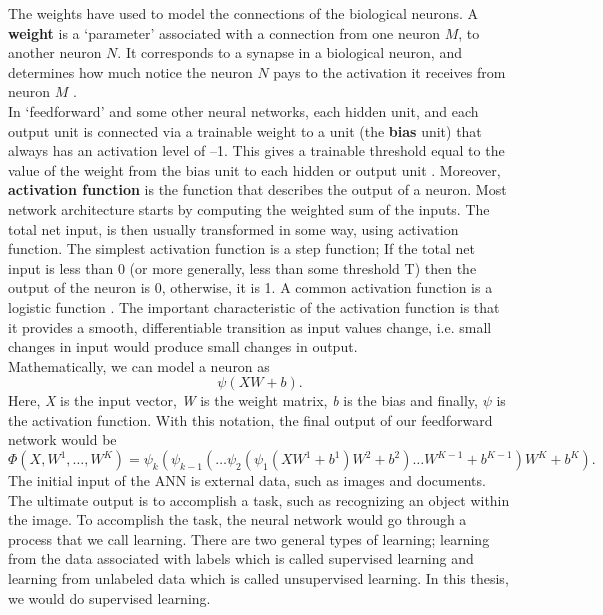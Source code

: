 The weights have used to model the connections of the biological neurons. A \textbf{weight} is a `parameter' associated with a connection from one neuron $M$, to another neuron $N$. It corresponds to a synapse in a biological neuron, and determines how much notice the neuron $N$ pays to the activation it receives from neuron $M$ \cite{MLDict}.\\ %
In `feedforward' and some other neural networks, each hidden unit, and each output unit is connected via a trainable weight to a unit (the \textbf{bias} unit) that always has an activation level of –1. This gives a trainable threshold equal to the value of the weight from the bias unit to each hidden or output unit \cite{MLDict}.
Moreover, \textbf{activation function} is the function that describes the output of a neuron. Most network architecture starts by computing the weighted sum of the inputs. The total net input, is then usually transformed in some way, using activation function. The simplest activation function is a step function; If the total net input is less than 0 (or more generally, less than some threshold T) then the output of the neuron is 0, otherwise, it is 1. A common activation function is a logistic function \cite{MLDict}. The important characteristic of the activation function is that it provides a smooth, differentiable transition as input values change, i.e. small changes in input would produce small changes in output.\\
Mathematically, we can model a neuron as
\begin{equation}
\psi(XW+b).
\end{equation} 
Here, \textit{X} is the input vector, \textit{W} is the weight matrix, \textit{b} is the bias and finally, $\psi$ is the activation function. With this notation, the final output of our feedforward network would be
\begin{equation}
\Phi(X,W^1,\dots,W^K) = \psi_{k}(\psi_{k-1}(\dots \psi_{2}(\psi_{1}(XW^1+b^1)W^2+b^2)\dots W^{K-1}+b^{K-1})W^{K}+b^{K}).
\end{equation}
The initial input of the ANN is external data, such as images and documents. The ultimate output is to accomplish a task, such as recognizing an object within the image. To accomplish the task, the neural network would go through a process that we call learning. There are two general types of learning; learning from the data associated with labels which is called supervised learning and learning from unlabeled data which is called unsupervised learning. In this thesis, we would do supervised learning. \\
